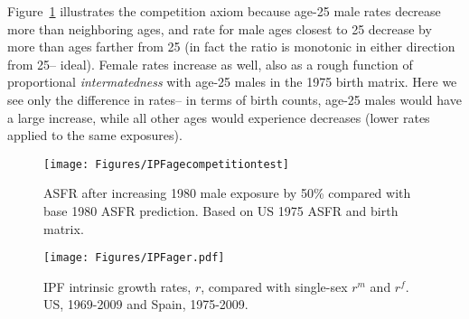Figure~\ref{fig:IPFcomp} illustrates the competition axiom because age-25 male
rates decrease more than neighboring ages, and rate for male ages closest to 25
decrease by more than ages farther from 25 (in fact the ratio is monotonic in
either direction from 25-- ideal). Female rates increase as well, also as a
rough function of proportional \textit{intermatedness} with age-25 males in the
1975 birth matrix. Here we see only the difference in rates-- in terms of birth
counts, age-25 males would have a large increase, while all other ages would
experience decreases (lower rates applied to the same exposures). 

\begin{figure}[ht!]
        \centering  
          \caption{ASFR after increasing 1980 male exposure by 50\% compared
          with base 1980 ASFR prediction. Based on US 1975 ASFR and birth
          matrix.}
           \texttt{[image: Figures/IPFagecompetitiontest]}
          \label{fig:IPFcomp}
\end{figure}

\begin{figure}[ht!]
        \centering  
          \caption{IPF intrinsic growth rates, $r$, compared with
          single-sex $r^m$ and $r^f$. US, 1969-2009 and Spain, 1975-2009.}
           \texttt{[image: Figures/IPFager.pdf]}
          \label{fig:IPFager}
\end{figure}



\FloatBarrier

